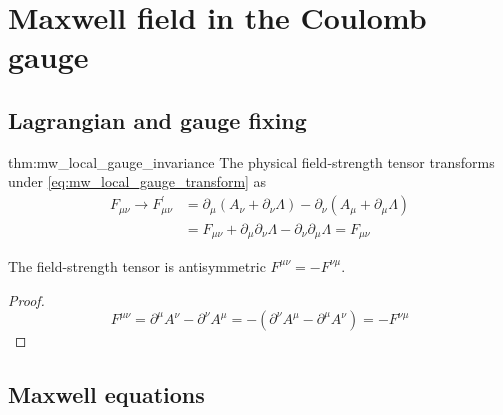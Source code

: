 \section{Maxwell field in the Coulomb gauge}

\subsection{Lagrangian and gauge fixing}

\begin{delayedproof}{thm:mw_local_gauge_invariance}
	The physical field-strength tensor transforms under \cref{eq:mw_local_gauge_transform} as
	\begin{equation*}
		\begin{split}
			F_{\mu\nu}
			\to
			F_{\mu\nu}^\prime
			&=
			\partial_\mu\left(A_\nu+\partial_\nu\Lambda\right)
			-
			\partial_\nu\left(A_\mu+\partial_\mu\Lambda\right)
			\\
			&=
			F_{\mu\nu}
			+
			\partial_\mu\partial_\nu\Lambda
			-
			\partial_\nu\partial_\mu\Lambda
			=
			F_{\mu\nu}
		\end{split}
	\end{equation*}	
\end{delayedproof}
\begin{lemma}
	The field-strength tensor is antisymmetric $F^{\mu\nu}=-F^{\nu\mu}$.
\end{lemma}
\begin{proof}
	\begin{equation*}
		F^{\mu\nu}
		=
		\partial^\mu A^\nu
		-
		\partial^\nu A^\mu
		=
		-
		\left(
			\partial^\nu A^\mu
			-
			\partial^\mu A^\nu
		\right)
		=
		-
		F^{\nu\mu}
	\end{equation*}
\end{proof}

\subsection{Maxwell equations}

